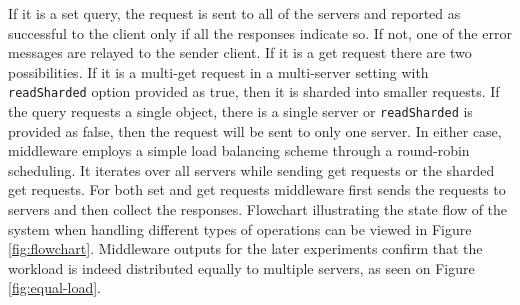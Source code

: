 \documentclass[11pt,a4paper]{article}
\begin{document}
\par If it is a set query, the request is sent to all of the servers and reported as successful to the client only if all the responses indicate so. If not, one of the error messages are relayed to the sender client. If it is a get request there are two possibilities. If it is a multi-get request in a multi-server setting with \texttt{readSharded} option provided as true, then it is sharded into smaller requests. If the query requests a single object, there is a single server or \texttt{readSharded} is provided as false, then the request will be sent to only one server. In either case, middleware employs a simple load balancing scheme through a round-robin scheduling. It iterates over all servers while sending get requests or the sharded get requests. For both set and get requests middleware first sends the requests to servers and then collect the responses. Flowchart illustrating the state flow of the system when handling different types of operations can be viewed in Figure \ref{fig:flowchart}. Middleware outputs for the later experiments confirm that the workload is indeed distributed equally to multiple servers, as seen on Figure \ref{fig:equal-load}.
%
\end{document}
